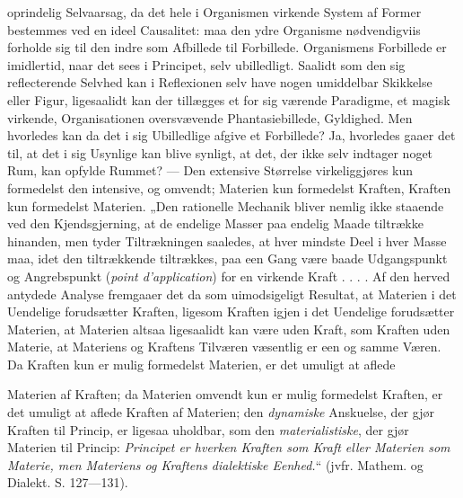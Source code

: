 \documentclass[12pt,a4paper]{book}
\begin{document}
oprindelig Selvaarsag, da det hele i Organismen virkende System af Former
bestemmes ved en ideel Causalitet: maa
den ydre Organisme nødvendigviis forholde sig til den indre som Afbillede
til Forbillede. Organismens Forbillede er
imidlertid, naar det sees i Principet, selv ubilledligt. Saalidt som den
sig reflecterende Selvhed kan i Reflexionen selv have nogen umiddelbar
Skikkelse eller Figur, ligesaalidt kan der tillægges et for sig værende
Paradigme, et magisk virkende, Organisationen oversvævende
Phantasiebillede, Gyldighed. Men hvorledes kan da det i sig Ubilledlige
afgive et Forbillede? Ja, hvorledes gaaer det til, at det i sig Usynlige
kan blive synligt, at det, der ikke selv indtager noget Rum, kan opfylde
Rummet? --- Den extensive Størrelse virkeliggjøres kun formedelst den
intensive, og omvendt; Materien kun formedelst Kraften, Kraften kun
formedelst Materien. „Den rationelle Mechanik bliver nemlig ikke
staaende ved den Kjendsgjerning, at de endelige Masser paa endelig Maade
tiltrække hinanden, men tyder Tiltrækningen saaledes, at hver mindste
Deel i hver Masse maa, idet den tiltrækkende tiltrækkes, paa een Gang
være baade Udgangspunkt og Angrebspunkt (\textit{point d'application})
for en virkende Kraft . . . . Af den herved antydede Analyse fremgaaer
det da som uimodsigeligt Resultat, at Materien i det Uendelige
forudsætter Kraften, ligesom Kraften igjen i det Uendelige forudsætter
Materien, at Materien altsaa ligesaalidt kan være uden Kraft, som Kraften
uden Materie, at Materiens og Kraftens Tilværen væsentlig er een og samme
Væren. Da Kraften kun er mulig formedelst Materien, er det umuligt at
aflede

Materien af Kraften; da Materien omvendt kun er mulig formedelst Kraften,
er det umuligt at aflede Kraften af Materien; den \emph{dynamiske}
Anskuelse, der gjør Kraften til Princip, er ligesaa uholdbar, som den
\emph{materialistiske}, der gjør Materien til Princip: \emph{Principet er
hverken Kraften som Kraft eller Materien som Materie, men Materiens og
Kraftens dialektiske Eenhed.}“ (jvfr. Mathem. og Dialekt. S. 127---131).
\end{document}
